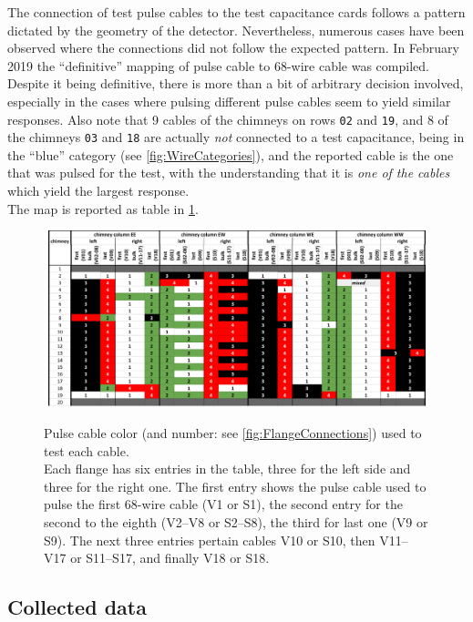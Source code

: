 The connection of test pulse cables to the test capacitance cards follows a
pattern dictated by the geometry of the detector. Nevertheless, numerous cases
have been observed where the connections did not follow the expected pattern.
In February 2019 the ``definitive'' mapping of pulse cable to 68-wire cable was
compiled. Despite it being definitive, there is more than a bit of arbitrary
decision involved, especially in the cases where pulsing different pulse cables
seem to yield similar responses. Also note that 9 cables of the chimneys on rows
\texttt{02} and \texttt{19}, and 8 of the chimneys \texttt{03} and \texttt{18}
are actually \emph{not} connected to a test capacitance, being in the ``blue''
category (see \cref{fig:WireCategories}), and the reported cable is the one
that was pulsed for the test, with the understanding that it is \emph{one of the
cables} which yield the largest response.
\\
The map is reported as table in \cref{fig:PulseCableMap}.
\begin{figure}
  {
    \centering
    \includegraphics[width=16cm,angle=270]{fig/FinalTestPulseMap}\\
  }
  \caption{\label{fig:PulseCableMap}
    Pulse cable color (and number: see \cref{fig:FlangeConnections})
    used to test each cable.\\
    Each flange has six entries in the table, three for the left side and
    three for the right one.
    The first entry shows the pulse cable used to pulse the first 68-wire cable
    (V1 or S1), the second entry for the second to the eighth (V2--V8 or
    S2--S8), the third for last one (V9 or S9). The next three entries pertain
    cables V10 or S10, then V11--V17 or S11--S17, and finally V18 or S18.
  }
\end{figure}



\subsection{Collected data}
\label{ssec:data}

